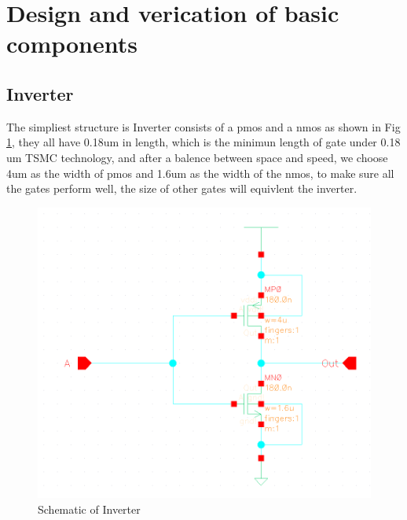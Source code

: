 \documentclass[conference]{IEEEtran}
\begin{document}
\section{Design and verication of basic components}


\label{basic}

\subsection{Inverter}

The simpliest structure is Inverter consists of a pmos and a nmos as shown in Fig \ref{Schematic of Inverter}, they all have 0.18um in length, which is the minimun length of gate under 0.18 um TSMC technology, and after a balence between space and speed, we choose 4um as the width of pmos and 1.6um as the width of the nmos, to make sure all the gates perform well, the size of other gates will equivlent the inverter.

\begin{figure}[H]
    \centering
    \includegraphics[width = 0.6\linewidth]{inv_schematic}
    \caption{Schematic of Inverter}
    \label{Schematic of Inverter}
\end{figure}
\end{document}
